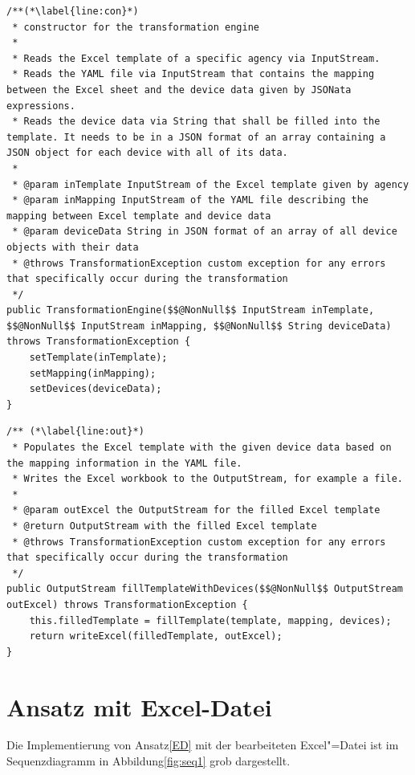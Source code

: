\begin{lstlisting}[emph={inTemplate, inMapping, deviceData, outExcel, template, mapping, devices, filledTemplate}]
/**(*\label{line:con}*)
 * constructor for the transformation engine
 * 
 * Reads the Excel template of a specific agency via InputStream.
 * Reads the YAML file via InputStream that contains the mapping between the Excel sheet and the device data given by JSONata expressions.
 * Reads the device data via String that shall be filled into the template. It needs to be in a JSON format of an array containing a JSON object for each device with all of its data.
 *
 * @param inTemplate InputStream of the Excel template given by agency
 * @param inMapping InputStream of the YAML file describing the mapping between Excel template and device data
 * @param deviceData String in JSON format of an array of all device objects with their data
 * @throws TransformationException custom exception for any errors that specifically occur during the transformation
 */
public TransformationEngine($$@NonNull$$ InputStream inTemplate, $$@NonNull$$ InputStream inMapping, $$@NonNull$$ String deviceData) throws TransformationException {
	setTemplate(inTemplate);
	setMapping(inMapping);
	setDevices(deviceData);
}
\end{lstlisting}
\begin{lstlisting}[emph={inTemplate, inMapping, deviceData, outExcel, template, mapping, devices, filledTemplate}, firstnumber=last,
caption=Auszüge aus der Klasse \texttt{TransformationEngine}, label=code:te]
/** (*\label{line:out}*)
 * Populates the Excel template with the given device data based on the mapping information in the YAML file.
 * Writes the Excel workbook to the OutputStream, for example a file.
 * 
 * @param outExcel the OutputStream for the filled Excel template
 * @return OutputStream with the filled Excel template
 * @throws TransformationException custom exception for any errors that specifically occur during the transformation
 */
public OutputStream fillTemplateWithDevices($$@NonNull$$ OutputStream outExcel) throws TransformationException {
	this.filledTemplate = fillTemplate(template, mapping, devices);
	return writeExcel(filledTemplate, outExcel);
}
\end{lstlisting}


\section{Ansatz mit Excel-Datei} \label{IED}

Die Implementierung von Ansatz\nbs\ref{ED} mit der bearbeiteten Excel"=Datei ist im Sequenzdiagramm in Abbildung\nbs\ref{fig:seq1} grob dargestellt.

